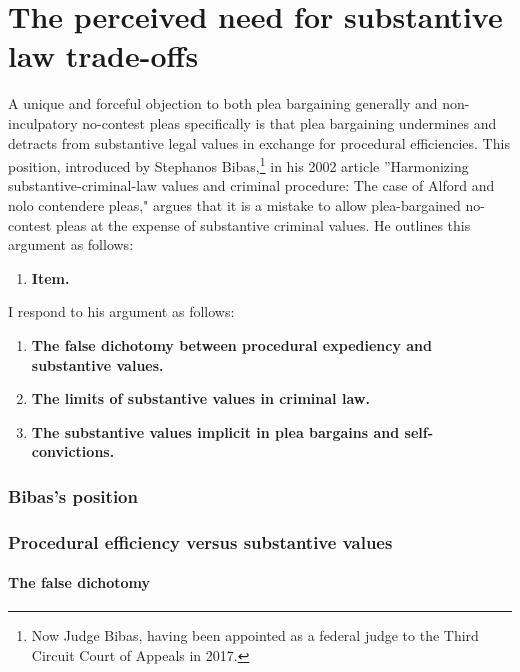 \section{The perceived need for substantive law trade-offs}

A unique and forceful objection to both plea bargaining generally and non-inculpatory no-contest pleas specifically is that plea bargaining undermines and detracts from substantive legal values in exchange for procedural efficiencies. This position, introduced by Stephanos Bibas,\footnote{Now Judge Bibas, having been appointed as a federal judge to the Third Circuit Court of Appeals in 2017.} in his 2002 article ''Harmonizing substantive-criminal-law values and criminal procedure: The case of Alford and nolo contendere pleas," argues that it is a mistake to allow plea-bargained no-contest pleas at the expense of substantive criminal values. He outlines this argument as follows:

\begin{enumerate}
    \item \textbf{Item.}
\end{enumerate}

I respond to his argument as follows:

\begin{enumerate}
    \item \textbf{The false dichotomy between procedural expediency and substantive values.}
    \item \textbf{The limits of substantive values in criminal law.}
    \item \textbf{The substantive values implicit in plea bargains and self-convictions.} 
\end{enumerate}

\subsubsection{Bibas's position}



\subsubsection{Procedural efficiency versus substantive values}

\paragraph{The false dichotomy\\}


